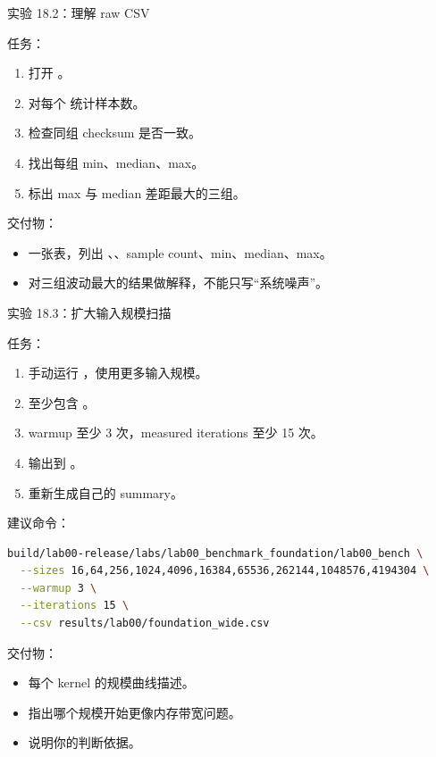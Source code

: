 \begin{labbox}
实验 18.2：理解 raw CSV

任务：

\begin{enumerate}
  \item 打开 。
  \item 对每个  统计样本数。
  \item 检查同组 checksum 是否一致。
  \item 找出每组 min、median、max。
  \item 标出 max 与 median 差距最大的三组。
\end{enumerate}

交付物：

\begin{itemize}
  \item 一张表，列出 、、sample count、min、median、max。
  \item 对三组波动最大的结果做解释，不能只写“系统噪声”。
\end{itemize}
\end{labbox}

\begin{labbox}
实验 18.3：扩大输入规模扫描

任务：

\begin{enumerate}
  \item 手动运行 ，使用更多输入规模。
  \item 至少包含 。
  \item warmup 至少 3 次，measured iterations 至少 15 次。
  \item 输出到 。
  \item 重新生成自己的 summary。
\end{enumerate}

建议命令：

\begin{lstlisting}[language=bash]
build/lab00-release/labs/lab00_benchmark_foundation/lab00_bench \
  --sizes 16,64,256,1024,4096,16384,65536,262144,1048576,4194304 \
  --warmup 3 \
  --iterations 15 \
  --csv results/lab00/foundation_wide.csv
\end{lstlisting}

交付物：

\begin{itemize}
  \item 每个 kernel 的规模曲线描述。
  \item 指出哪个规模开始更像内存带宽问题。
  \item 说明你的判断依据。
\end{itemize}
\end{labbox}

